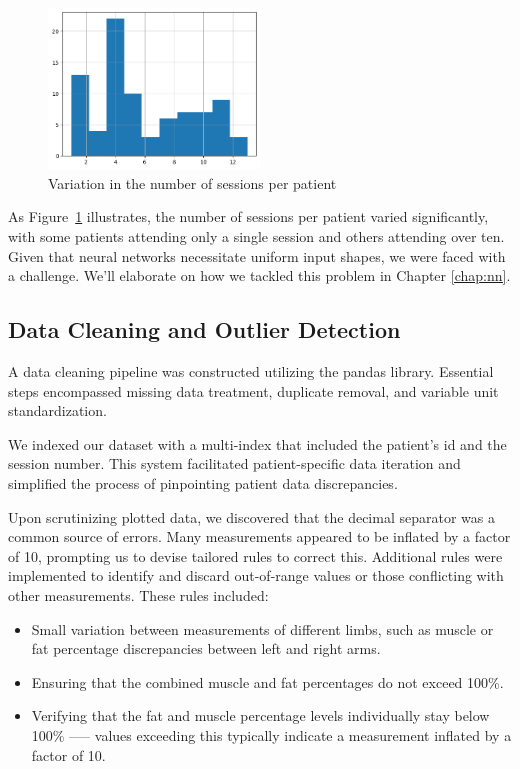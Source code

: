 \begin{figure}[h]
    \centering
    \includegraphics[width=0.5\textwidth]{files/sessions_per_patient}
    \caption{Variation in the number of sessions per patient}
    \label{fig:sessions-per-patient}
\end{figure}

As Figure~\ref{fig:sessions-per-patient} illustrates, the number of sessions
per patient varied significantly, with some patients attending only a single
session and others attending over ten. Given that neural networks necessitate
uniform input shapes, we were faced with a challenge. We'll elaborate on how we
tackled this problem in Chapter \ref{chap:nn}.
\subsection{Data Cleaning and Outlier Detection}

A data cleaning pipeline was constructed utilizing the \gls{pandas} library.
Essential steps encompassed missing data treatment, duplicate removal, and
variable unit standardization.

We indexed our dataset with a multi-index that included the patient's id and
the session number. This system facilitated patient-specific data iteration and
simplified the process of pinpointing patient data discrepancies.

Upon scrutinizing plotted data, we discovered that the decimal separator was a
common source of errors. Many measurements appeared to be inflated by a factor
of 10, prompting us to devise tailored rules to correct this. Additional rules
were implemented to identify and discard out-of-range values or those
conflicting with other measurements. These rules included:

\begin{itemize}
    \item Small variation between measurements of different limbs, such as muscle or fat
          percentage discrepancies between left and right arms.
    \item Ensuring that the combined muscle and fat percentages do not exceed 100\%.
    \item Verifying that the fat and muscle percentage levels individually stay below
          100\% --— values exceeding this typically indicate a measurement inflated by a
          factor of 10.
\end{itemize}

